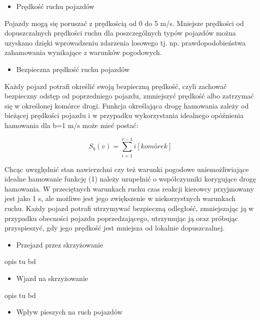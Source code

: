 \documentclass{sprawozdanie-agh}
\begin{document}
\begin{multicols}{2}
		\begin{itemize}
			\item Prędkość ruchu pojazdów
		\end{itemize}

		Pojazdy mogą się poruszać z prędkością od 0 do 5 m/s. Mniejsze prędkości od dopuszczalnych prędkości ruchu dla poszczególnych typów pojazdów można uzyskano dzięki wprowadzeniu zdarzenia losowego tj. np. prawdopodobieństwa zahamowania wynikające z warunków pogodowych.

		\begin{itemize}
			\item 	Bezpieczna prędkość ruchu pojazdów
		\end{itemize}

		Każdy pojazd potrafi określić swoją bezpieczną prędkość, czyli zachować bezpieczny odstęp od poprzedniego pojazdu, zmniejszyć prędkość albo zatrzymać się w określonej komórce drogi. Funkcja określająca drogę hamowania zależy od bieżącej prędkości pojazdu i w przypadku wykorzystania idealnego opóźnienia hamowania dla b=1 m/s może mieć postać:

		\begin{equation}
			S_{b}(v)=\sum_{i=1}^{v-1} i[komórek]
		\end{equation}

		Chcąc uwzględnić stan nawierzchni czy też warunki pogodowe uniemożliwiające idealne hamowanie funkcję (1) należy uzupełnić o współczynniki korygujące drogę hamowania.
		W przeciętnych warunkach ruchu czas reakcji kierowcy przyjmowany jest jako 1 s, ale możliwe jest jego zwiększenie w niekorzystnych warunkach ruchu.
		Każdy pojazd potrafi utrzymywać bezpieczną odległość, zmniejszając ją w przypadku obecności pojazdu poprzedzającego, utrzymując ją oraz próbując przyspieszyć, gdy jego prędkość jest mniejsza od lokalnie dopuszczalnej.

		\begin{itemize}
			\item 	Przejazd przez skrzyżowanie
		\end{itemize}

		opis tu bd

		\begin{itemize}
			\item 	Wjazd na skrzyżowanie
		\end{itemize}

		opis tu bd

		\begin{itemize}
			\item 	Wpływ pieszych na ruch pojazdów
		\end{itemize}


\end{multicols}
\end{document}
